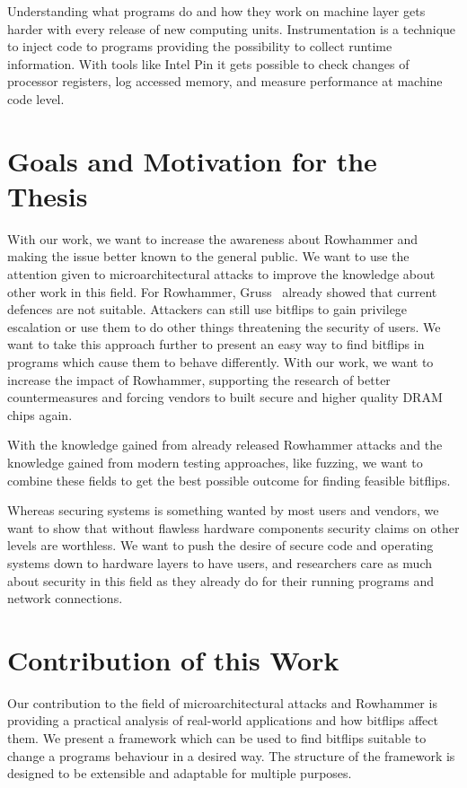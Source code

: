 Understanding what programs do and how they work on machine layer gets harder
with every release of new computing units. Instrumentation is a technique to
inject code to programs providing the possibility to collect runtime
information. With tools like Intel Pin\cite{pintool} it gets possible to check
changes of processor registers, log accessed memory, and measure performance at
machine code level.

\section{Goals and Motivation for the Thesis}

With our work, we want to increase the awareness about Rowhammer and making the
issue better known to the general public. We want to use the attention given to
microarchitectural attacks to improve the knowledge about other work in this
field. For Rowhammer, Gruss~\etal\cite{flipinthewall} already showed that
current defences are not suitable. Attackers can still use bitflips to gain
privilege escalation or use them to do other things threatening the security of
users. We want to take this approach further to present an easy way to find
bitflips in programs which cause them to behave differently. With our work, we
want to increase the impact of Rowhammer, supporting the research of better
countermeasures and forcing vendors to built secure and higher quality DRAM
chips again.

With the knowledge gained from already released Rowhammer attacks and the
knowledge gained from modern testing approaches, like fuzzing, we want to
combine these fields to get the best possible outcome for finding feasible
bitflips.

Whereas securing systems is something wanted by most users and vendors, we want
to show that without flawless hardware components security claims on other
levels are worthless. We want to push the desire of secure code and operating
systems down to hardware layers to have users, and researchers care as much
about security in this field as they already do for their running programs and
network connections.

\section{Contribution of this Work}

Our contribution to the field of microarchitectural attacks and Rowhammer is
providing a practical analysis of real-world applications and how bitflips
affect them. We present a framework which can be used to find bitflips suitable
to change a program\textquotesingle s behaviour in a desired way. The structure
of the framework is designed to be extensible and adaptable for multiple
purposes.

